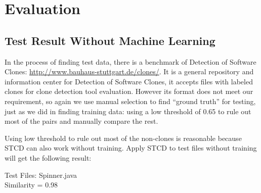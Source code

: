 \documentclass[../main.tex]{subfiles}
\begin{document}
\section{Evaluation}

\subsection{Test Result Without Machine Learning}

In the process of finding test data, there is a benchmark of Detection of Software Clones: {\color{blue} \url{http://www.bauhaus-stuttgart.de/clones/}}. It is a general repository and information center for Detection of Software Clones, it accepts files with labeled clones for clone detection tool evaluation. However its format does not meet our requirement, so again we use manual selection to find ``ground truth'' for testing, just as we did in finding training data: using a low threshold of 0.65 to rule out most of the pairs and manually compare the rest.

Using low threshold to rule out most of the non-clones is reasonable because STCD can also work without training. Apply STCD to test files without training will get the following result:


Test Files: Spinner.java \\
Similarity = 0.98 \\
\end{document}
